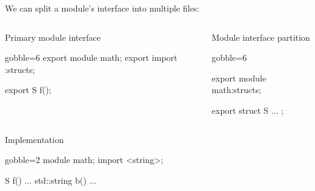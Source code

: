 \begin{frame}[fragile,shrink=5]
  \begin{block}{}
    We can split a module's interface into multiple files:
  \end{block}
  \vspace{-5mm}
  \begin{columns}[t]
    \begin{column}{.4\textwidth}
      \begin{exampleblock}{Primary module interface}
        \begin{cppcode*}{gobble=6}
          export module math;
          export import :structs;

          export S f();
        \end{cppcode*}
      \end{exampleblock}
    \end{column}
    \begin{column}{.5\textwidth}
      \begin{exampleblock}{Module interface partition}
        \begin{cppcode*}{gobble=6}

          export module math:structs;

          export struct S { ... };
        \end{cppcode*}
      \end{exampleblock}
    \end{column}
  \end{columns}
  \begin{exampleblock}{Implementation}
    \begin{cppcode*}{gobble=2}
      module math;
      import <string>;

      S f() { ... }
      std::string b() { ... }
    \end{cppcode*}
  \end{exampleblock}
\end{frame}

